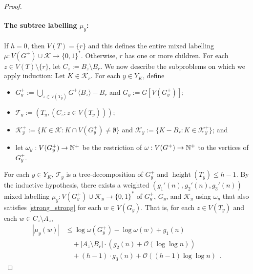 \documentclass{patmorin}
\renewcommand{\le}{\leqslant}
\newcommand{\torso}[2]{{#1}\langle{#2}\rangle}
\DeclareMathOperator{\height}{height}
\newcommand{\Oh}{\mathcal{O}}
\let\eqref\cref
\begin{document}
\begin{proof}
    \paragraph{\boldmath The subtree labelling $\mu_y$:}
    If $h=0$, then $V(T)=\{r\}$ and this defines the entire mixed labelling $\mu:V(G^+)\cup\mathcal{K}\to\{0,1\}^*$.
    Otherwise, $r$ has one or more children.  For each $z\in V(T)\setminus\{r\}$, let $C_z:=B_z\setminus B_r$.
    We now describe the subproblems on which we apply induction: Let $K\in \mathcal{K}_r$.
    For each $y\in Y_K$, define
    \begin{itemize}
        \item $G^+_y:=\bigcup_{z\in V(T_y)}\torso{G^+}{B_z}-B_r$ and $G_y:=G[V(G^+_y)]$;
        \item $\mathcal{T}_y:=(T_y, (C_z:z\in V(T_y)))$;
        \item $\mathcal{K}^+_y:=\{K\in\mathcal{K}:K\cap V(G^+_y)\neq\emptyset\}$ and $\mathcal{K}_y:=\{K-B_r:K\in\mathcal{K}^+_y\}$; and
        \item let $\omega_y:V(G^+_y)\to\mathbb{N}^+$ be the restriction of $\omega:V(G^+)\to\mathbb{N}^+$ to the vertices of $G^+_y$.
    \end{itemize}
    For each $y\in Y_K$, $\mathcal{T}_y$ is a tree-decomposition of $G^+_y$ and $\height(T_y)\le h-1$.
    By the inductive hypothesis, there exists a weighted $(g_1'(n),g_2'(n),g_3'(n))$ mixed labelling $\mu_y:V(G^+_y)\cup\mathcal{K}_y\to\{0,1\}^*$ of $G^+_y$, $G_y$, and $\mathcal{K}_y$ using $\omega_y$ that also satisfies \eqref{strong_strong} for each $w\in V(G_y)$.  That is, for each $z\in V(T_y)$ and each $w\in C_z\setminus A_z$,
    \begin{align*}
       |\mu_y(w)| & \le \log \omega(G^+_y) - \log\omega(w) + g_1(n) \\
       & \quad {} + |A_z\setminus B_r|\cdot (g_2(n) + \Oh(\log\log n)) \\
       & \quad {} + (h-1)\cdot g_3(n) + \Oh((h-1)\log\log n) \enspace .
    \end{align*}


\end{proof}
\end{document}

